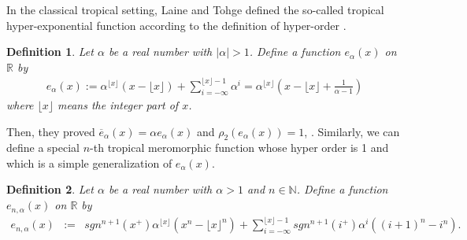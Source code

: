 \documentclass{article}
\newtheorem{defin}{Definition}[section]
\newenvironment{definition}{\begin{defin}\rm}{\end{defin}}
\begin{document}
In the classical tropical setting, Laine and Tohge defined the so-called tropical hyper-exponential function according to the definition of hyper-order \cite{Secm}.
\begin{definition}
    \cite{Secm} Let $\alpha$ be a real number with $|\alpha|>1$. Define a function $e_{\alpha}(x)$ on $\mathbb{R}$ by
    \begin{eqnarray*}
        e_{\alpha}(x):=\alpha^{\lfloor x\rfloor}(x-\lfloor x\rfloor)+\sum_{i=-\infty}^{\lfloor x\rfloor-1}\alpha^{i}=\alpha^{\lfloor x\rfloor}\left(x-\lfloor x\rfloor+\frac{1}{\alpha-1}\right)
    \end{eqnarray*}
    where $\lfloor x\rfloor$ means the integer part of $x$.
\end{definition}

Then, they proved $\overline{e}_{\alpha}(x)=\alpha e_{\alpha}(x)$ \cite[Proposition 8.3 ]{Secm} and $\rho_{2}(e_{\alpha}(x))=1$, \cite[Proposition 8.5]{Secm}. Similarly, we can define a special $n$-th tropical meromorphic function whose hyper order is 1 and which is a simple generalization of $e_{\alpha}(x)$.
\begin{definition}
    Let $\alpha$ be a real number with $\alpha>1$ and $n\in\mathbb{N}$. Define a function $e_{n, \alpha}(x)$ on $\mathbb{R}$ by
    \begin{eqnarray*}
        e_{n, \alpha}(x)&:=&sgn^{n+1}(x^{+})\alpha^{\lfloor x\rfloor}(x^{n}-\lfloor x\rfloor^{n})+\sum_{i=-\infty}^{\lfloor x\rfloor-1}sgn^{n+1}(i^{+})\alpha^{i}((i+1)^{n}-i^{n}).
    \end{eqnarray*}
\end{definition}
\end{document}
